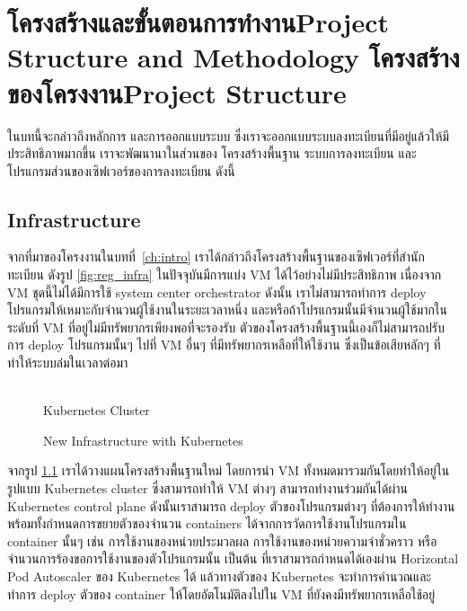 \chapter{\ifproject%
\ifcpe โครงสร้างและขั้นตอนการทำงาน\else Project Structure and Methodology\fi
\else%
\ifcpe โครงสร้างของโครงงาน\else Project Structure\fi
\fi
}
\label{ch:approach}

ในบทนี้จะกล่าวถึงหลักการ และการออกแบบระบบ ซึ่งเราจะออกแบบระบบลงทะเบียนที่มีอยู่แล้วให้มีประสิทธิภาพมากขึ้น เราจะพัฒนานาในส่วนของ โครงสร้างพื้นฐาน ระบบการลงทะเบียน และ โปรแกรมส่วนของเซิฟเวอร์ของการลงทะเบียน ดังนี้

\makeatletter

\section {Infrastructure}
\label{sec:infra}

จากที่มาของโครงงานในบทที่~\ref{ch:intro} เราได้กล่าวถึงโครงสร้างพื้นฐานของเซิฟเวอร์ที่สำนักทะเบียน ดังรูป \ref{fig:reg_infra} ในปัจจุบันมีการแบ่ง VM \cite{vm} ได้ไว้อย่างไม่มีประสิทธิภาพ เนื่องจาก VM ชุดนี้ไม่ได้มีการใช้ system center orchestrator \cite{sco} ดังนั้น เราไม่สามารถทำการ deploy โปรแกรมให้เหมาะกับจำนวนผู้ใช้งานในระยะเวลาหนึ่ง และหรือถ้าโปรแกรมนั้นมีจำนวนผู้ใช้มากในระดับที่ VM ที่อยู่ไม่มีทรัพยากรเพียงพอที่จะรองรับ ตัวของโครงสร้างพื้นฐานนี้เองก็ไม่สามารถปรับการ deploy โปรแกรมนั้นๆ ไปที่ VM อื่นๆ ที่มีทรัพยากรเหลือที่ให้ใช้งาน ซึ่งเป็นข้อเสียหลักๆ ที่ทำให้ระบบล่มในเวลาต่อมา

\begin{figure}
    \centering
    \begin{center}
     \\
    Kubernetes Cluster
    \end{center}
    \caption[Poem]{New Infrastructure with Kubernetes}
    \label{fig:new_infra}
\end{figure}

จากรูป \ref{fig:new_infra} เราได้วางแผนโครงสร้างพื้นฐานใหม่ โดยการนำ VM ทั้งหมดมารวมกันโดยทำให้อยู่ในรูปแบบ Kubernetes cluster ซึ่งสามารถทำให้ VM ต่างๆ สามารถทำงานร่วมกันได้ผ่าน Kubernetes control plane \cite{kubecomp} ดังนั้นเราสามารถ deploy ตัวของโปรแกรมต่างๆ ที่ต้องการให้ทำงาน พร้อมทั้งกำหนดการขยายตัวของจำนวน containers ได้จากการวัดการใช้งานโปรแกรมใน container นั้นๆ เช่น การใช้งานของหน่วยประมวลผล การใช้งานของหน่วยความจำชั่วคราว หรือจำนวนการร้องขอการใช้งานของตัวโปรแกรมนั้น เป็นต้น ที่เราสามารถกำหนดได้เองผ่าน Horizontal Pod Autoscaler \cite{kubehpa} ของ Kubernetes ได้ แล้วทางตัวของ Kubernetes จะทำการคำนวณและทำการ deploy ตัวของ container ให้โดยอัตโนมัติลงไปใน VM ที่ยังคงมีทรัพยากรเหลือใช้อยู่

